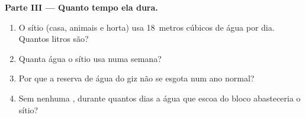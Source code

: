 \begin{problem}
\medskip
\noindent\textbf{Parte III --- Quanto tempo ela dura.}
\begin{enumerate}[resume]
  \item O sítio (casa, animais e horta) usa 18~metros cúbicos de água por
        dia. Quantos litros são?
  \item Quanta água o sítio usa numa semana?
  \item Por que a reserva de água do giz não se esgota num ano normal?
  \item Sem nenhuma , durante quantos dias a água que escoa do bloco
        abasteceria o sítio?
\end{enumerate}
\end{problem}
